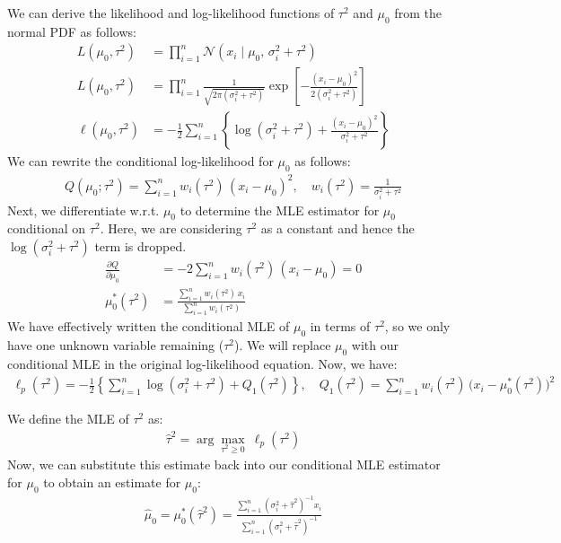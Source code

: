 \documentclass[letterpaper, 11pt]{extarticle}
\begin{document}
We can derive the likelihood and log-likelihood functions of $\tau^2$ and $\mu_0$ from the normal PDF as follows:
\begin{align}
L(\mu_0, \tau^2)
&= \prod_{i=1}^{n}
  \mathcal{N}\!\left(x_i \mid \mu_0,\, \sigma_i^2 + \tau^2\right)\\
L(\mu_0, \tau^2)
&= \prod_{i=1}^{n}
  \frac{1}{\sqrt{2\pi(\sigma_i^2 + \tau^2)}}
  \exp\!\left[
    -\frac{(x_i - \mu_0)^2}{2(\sigma_i^2 + \tau^2)}
  \right]\\
  \ell(\mu_0, \tau^2)
&= -\frac{1}{2} \sum_{i=1}^{n}
  \left\{
    \log(\sigma_i^2 + \tau^2)
    + \frac{(x_i - \mu_0)^2}{\sigma_i^2 + \tau^2}
  \right\}
\end{align}
We can rewrite the conditional log-likelihood for $\mu_0$ as follows:
\begin{align}
Q(\mu_0;\tau^2)=\sum_{i=1}^{n}w_i(\tau^2)\,(x_i-\mu_0)^2,
\quad w_i(\tau^2)=\frac{1}{\sigma_i^2+\tau^2}
\end{align}
Next, we differentiate w.r.t. $\mu_0$ to determine the MLE estimator for $\mu_0$ conditional on $\tau^2$. Here, we are considering $\tau^2$ as a constant and hence the $\log(\sigma_i^2 + \tau^2)$ term is dropped.
\begin{align}
    \frac{\partial Q}{\partial \mu_0}
&=-2\sum_{i=1}^{n}w_i(\tau^2)\,(x_i-\mu_0)=0\\
\mu_0^*(\tau^2)&=\frac{\sum_{i=1}^{n} w_i(\tau^2)\,x_i}{\sum_{i=1}^{n} w_i(\tau^2)}
\end{align}
We have effectively written the conditional MLE of $\mu_0$ in terms of $\tau^2$, so we only have one unknown variable remaining ($\tau^2$). We will replace $\mu_0$ with our conditional MLE in the original log-likelihood equation. Now, we have:
\begin{align}
    \ell_p(\tau^2)
= -\frac12\left\{
\sum_{i=1}^{n}\log(\sigma_i^2+\tau^2)
	+	Q_1(\tau^2)
\right\}, \quad Q_1(\tau^2)=\sum_{i=1}^{n} w_i(\tau^2)\,\bigl(x_i-\mu_0^*(\tau^2)\bigr)^2
\end{align} 

We define the MLE of $\tau^2$ as:
\begin{align}
    \ \hat{\tau}^2=\arg\max_{\tau^2\ge 0}\ \ell_p(\tau^2)\
\end{align}
Now, we can substitute this estimate back into our conditional MLE estimator for $\mu_0$ to obtain an estimate for $\mu_0$:
\begin{align}
    \ \hat{\mu}_0=\mu_0^*(\hat{\tau}^2)
=\frac{\sum_{i=1}^{n} (\sigma_i^2+\hat{\tau}^2)^{-1} x_i}
{\sum_{i=1}^{n} (\sigma_i^2+\hat{\tau}^2)^{-1}}\
\end{align}
\end{document}
